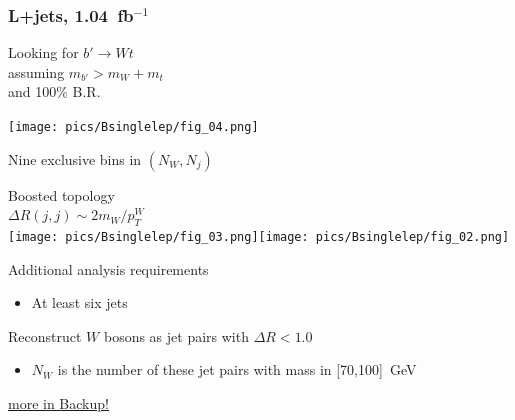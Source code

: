 \documentclass[xcolor=dvipsnames,10pt]{beamer}
\newcommand{\ifb}{~fb$^{-1}$}
\begin{document}
\begin{frame}\frametitle{L+jets, 1.04\ifb~\cite{ATLAS:2012aw}} %
\footnotesize\centering

\begin{minipage}{.35\textwidth}
\centering

Looking for \alert{$b'\rightarrow Wt$}\\
\scriptsize
assuming $m_{b'} > m_W + m_t$\\
and 100\% B.R.

\vspace{\baselineskip}
\vspace{\baselineskip}

\texttt{[image: pics/Bsinglelep/fig\_04.png]}

Nine exclusive bins in $(N_W, N_j)$

\end{minipage}\begin{minipage}{.65\textwidth}
\centering
\alert{Boosted topology}\\
\scriptsize
$\Delta R(j,j) \sim 2m_W/p_T^W$\\

\texttt{[image: pics/Bsinglelep/fig\_03.png]}\texttt{[image: pics/Bsinglelep/fig\_02.png]}


Additional analysis requirements

\scriptsize
\begin{itemize}
\item At least \alert{six jets}%
\end{itemize}
Reconstruct $W$ bosons as \alert{jet pairs} with $\Delta R<1.0$
\begin{itemize}
\item $N_W$ is the number of these jet pairs with mass in [70,100]~GeV
\end{itemize}

\end{minipage}

\begin{flushright}\scriptsize \hyperlink{Bsinglelep}{more in Backup!}\end{flushright}

\vspace{-\baselineskip}
\vspace{-\baselineskip}

\end{frame}
\end{document}
